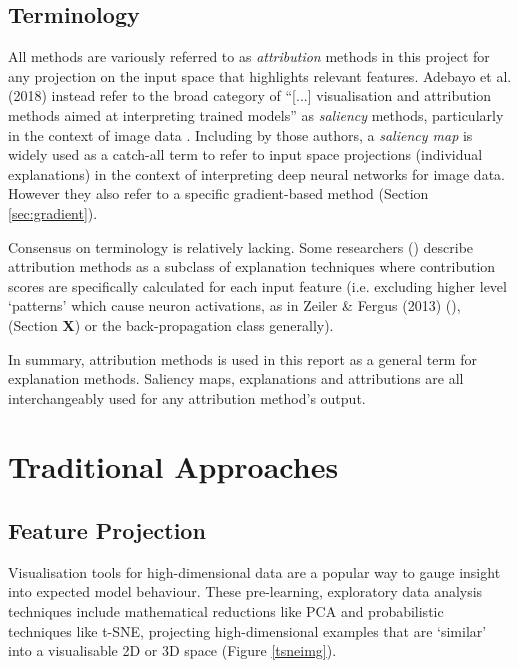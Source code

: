 \documentclass[main]{subfiles}
\begin{document}
\subsection*{Terminology}
All methods are variously referred to as \textit{attribution} methods in this project for any projection on the input space that highlights relevant features. Adebayo et al. (2018) instead refer to the broad category of ``[...] visualisation and attribution methods aimed at interpreting trained models'' as \textit{saliency} methods, particularly in the context of image data \cite{sanity}. Including by those authors, a \textit{saliency map} is widely used as a catch-all term to refer to input space projections (individual explanations) in the context of interpreting deep neural networks for image data. However they also refer to a specific gradient-based method (Section \ref{sec:gradient}). 

Consensus on terminology is relatively lacking. Some researchers (\cite{patternnet}) describe attribution methods as a subclass of explanation techniques where contribution scores are specifically calculated for each input feature (i.e. excluding higher level `patterns' which cause neuron activations, as in Zeiler \& Fergus (2013) (\cite{zeilerfergus2013}), (Section \textbf{X}) or the back-propagation class generally). 

In summary, attribution methods is used in this report as a general term for explanation methods. Saliency maps, explanations and attributions are all interchangeably used for any attribution method's output.


\section{Traditional Approaches}

\subsection{Feature Projection}
Visualisation tools for high-dimensional data are a popular way to gauge insight into expected model behaviour.  These pre-learning, exploratory data analysis techniques include mathematical reductions like PCA and probabilistic techniques like t-SNE,  projecting high-dimensional examples that are `similar' into a visualisable 2D or 3D space \cite{tsnepaper} (Figure \ref{tsneimg}).
\end{document}
